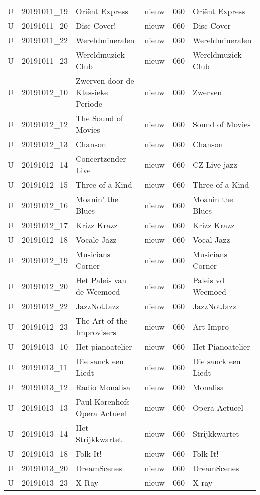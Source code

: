 \documentclass[]{article}
\begin{document}
\begin{longtable}[l]{llllll}
U & 20191011\_19 & Oriënt Express & nieuw & 060 & Oriënt Express\\
U & 20191011\_20 & Disc-Cover! & nieuw & 060 & Disc-Cover\\
U & 20191011\_22 & Wereldmineralen & nieuw & 060 & Wereldmineralen\\
U & 20191011\_23 & Wereldmuziek Club & nieuw & 060 & Wereldmuziek Club\\
\addlinespace
U & 20191012\_10 & Zwerven door de Klassieke Periode & nieuw & 060 & Zwerven\\
U & 20191012\_12 & The Sound of Movies & nieuw & 060 & Sound of Movies\\
U & 20191012\_13 & Chanson & nieuw & 060 & Chanson\\
U & 20191012\_14 & Concertzender Live & nieuw & 060 & CZ-Live jazz\\
U & 20191012\_15 & Three of a Kind & nieuw & 060 & Three of a Kind\\
\addlinespace
U & 20191012\_16 & Moanin’ the Blues & nieuw & 060 & Moanin the Blues\\
U & 20191012\_17 & Krizz Krazz & nieuw & 060 & Krizz Krazz\\
U & 20191012\_18 & Vocale Jazz & nieuw & 060 & Vocal Jazz\\
U & 20191012\_19 & Musicians Corner & nieuw & 060 & Musicians Corner\\
U & 20191012\_20 & Het Paleis van de Weemoed & nieuw & 060 & Paleis vd Weemoed\\
\addlinespace
U & 20191012\_22 & JazzNotJazz & nieuw & 060 & JazzNotJazz\\
U & 20191012\_23 & The Art of the Improvisers & nieuw & 060 & Art Impro\\
U & 20191013\_10 & Het pianoatelier & nieuw & 060 & Het Pianoatelier\\
U & 20191013\_11 & Die sanck een Liedt & nieuw & 060 & Die sanck een Liedt\\
U & 20191013\_12 & Radio Monalisa & nieuw & 060 & Monalisa\\
\addlinespace
U & 20191013\_13 & Paul Korenhofs Opera Actueel & nieuw & 060 & Opera Actueel\\
U & 20191013\_14 & Het Strijkkwartet & nieuw & 060 & Strijkkwartet\\
U & 20191013\_18 & Folk It! & nieuw & 060 & Folk It!\\
U & 20191013\_20 & DreamScenes & nieuw & 060 & DreamScenes\\
U & 20191013\_23 & X-Ray & nieuw & 060 & X-ray\\

\end{longtable}
\end{document}
